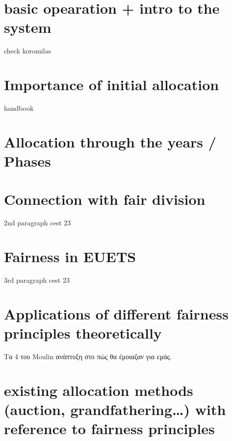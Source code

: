 \section{basic opearation + intro to the system}
check koromilas
\section{Importance of initial allocation}
handbook
\section{Allocation through the years / Phases}

\section{Connection with fair division}
2nd paragraph cest 23
\section{Fairness in EUETS}
3rd paragraph cest 23
\section{Applications of different fairness principles theoretically}
Τα 4 του Moulin ανάπτυξη στο πώς θα έμοιαζαν για εμάς. 
\section{existing allocation methods (auction, grandfathering\dots ) with reference to fairness principles}
